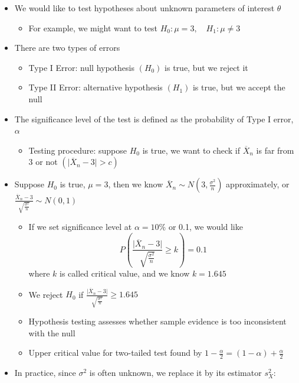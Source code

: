 \documentclass{article}
\begin{document}
\begin{itemize}
\begin{itemize}
\begin{itemize}
\begin{itemize}
            \end{itemize}
        \end{itemize}
    \end{itemize}
    \item We would like to test hypotheses about unknown parameters of interest $\theta$
    \begin{itemize}
        \item For example, we might want to test $H_0: \mu = 3, \quad H_1 : \mu \neq 3$
    \end{itemize}
    \item There are two types of errors
    \begin{itemize}
        \item Type I Error: null hypothesis $(H_0)$ is true, but we reject it
        \item Type II Error: alternative hypothesis $(H_1)$ is true, but we accept the null
    \end{itemize}
    \item The significance level of the test is defined as the probability of Type I error, $\alpha$
    \begin{itemize}
        \item Testing procedure: suppose $H_0$ is true, we want to check if $\overline{X}_n$ is far from 3 or not $(\vert \overline{X}_n - 3 \vert > c)$
    \end{itemize}
    \item Suppose $H_0$ is true, $\mu = 3$, then we know $\overline{X}_n \sim N(3,\frac{\sigma^2}{n})$ approximately, or $\frac{\overline{X}_n - 3}{\sqrt{\frac{\sigma^2}{n}}} \sim N(0,1)$
    \begin{itemize}
        \item If we set significance level at $\alpha = 10\%$ or 0.1, we would like
        \[
        P\left( \frac{\vert \overline{X}_n - 3 \vert }{\sqrt{\frac{\sigma^2}{n}}} \ge k \right) = 0.1
        \]
        where $k$ is called critical value, and we know $k = 1.645$
        \item We reject $H_0$ if $\frac{\vert \overline{X}_n - 3 \vert }{\sqrt{\frac{\sigma^2}{n}}} \ge 1.645$
        \item Hypothesis testing assesses whether sample evidence is too inconsistent with the null
        \item Upper critical value for two-tailed test found by $1-\frac{\alpha}{2} = (1-\alpha) + \frac{\alpha}{2}$
    \end{itemize}
    \item In practice, since $\sigma^2$ is often unknown, we replace it by its estimator $s_X^2$:

\end{itemize}
\end{document}
